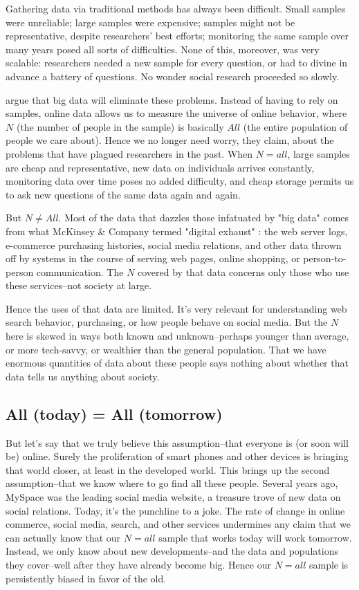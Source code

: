\documentclass[12pt]{article}
\begin{document}
Gathering data via traditional methods has always been
difficult. Small samples were unreliable; large samples were
expensive; samples might not be representative, despite researchers'
best efforts; monitoring the same sample over many years posed all
sorts of difficulties. None of this, moreover, was very scalable:
researchers needed a new sample for every question, or had to divine
in advance a battery of questions. No wonder social
research proceeded so slowly.

\cite{mayer2013big} argue that big data will eliminate these
problems. Instead of having to rely on samples, online data allows us
to measure the universe of online behavior, where $N$ (the number of
people in the sample) is basically $All$ (the entire population of
people we care about). Hence we no longer need worry, they claim,
about the problems that have plagued researchers in the past. When
$N=all$, large samples are cheap and representative, new data on
individuals arrives constantly,  monitoring data over time poses no
added difficulty, and cheap storage permits us to ask new questions of
the same data again and again.

But $N\neq All$. Most of the data that dazzles those infatuated by
"big data" comes from what McKinsey \& Company termed "digital
exhaust" \citep{mckinsey2011}: the web server logs, e-commerce
purchasing histories, social media relations, and other data thrown
off by systems in the course of serving web pages, online shopping,
or person-to-person communication. The $N$ covered by that data
concerns only those who use these services--not society at large.

Hence the uses of that data are limited. It's very relevant for
understanding web search behavior, purchasing, or how people behave on
social media. But the $N$ here is skewed in ways both known and
unknown--perhaps younger than average, or more tech-savvy, or
wealthier than the general population. That we have enormous
quantities of data about these people says nothing about whether that
data tells us anything about society.



\subsection{All (today) = All (tomorrow)}
\label{sec:all-today-tomorrow}

But let's say that we truly believe this assumption--that everyone is
(or soon will be) online. Surely the proliferation of smart phones and
other devices is bringing that world closer, at least in the developed
world. This brings up the second assumption--that we know where to go
find all these people. Several years ago, MySpace was the leading
social media website, a treasure trove of new data on social
relations. Today, it's the punchline to a joke. The rate of change in
online commerce, social media, search, and other services undermines
any claim that we can actually know that our $N=all$ sample that works
today will work tomorrow. Instead, we only know about new
developments--and the data and populations they cover--well after they
have already become big. Hence our $N=all$ sample is persistently
biased in favor of the old.
\end{document}

